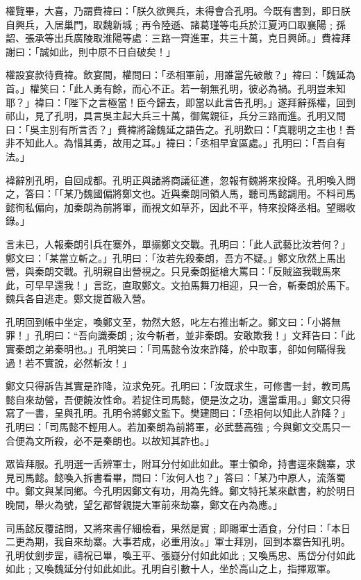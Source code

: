 權覽畢，大喜，乃謂費褘曰：「朕久欲興兵，未得會合孔明。今既有書到，即日朕自興兵，入居巢門，取魏新城﹔再令陸遜、諸葛瑾等屯兵於江夏沔口取襄陽﹔孫韶、張承等出兵廣陵取淮陽等處：三路一齊進軍，共三十萬，克日興師。」費褘拜謝曰：「誠如此，則中原不日自破矣！」

權設宴款待費褘。飲宴間，權問曰：「丞相軍前，用誰當先破敵？」褘曰：「魏延為首。」權笑曰：「此人勇有餘，而心不正。若一朝無孔明，彼必為禍。孔明豈未知耶？」褘曰：「陛下之言極當！臣今歸去，即當以此言告孔明。」遂拜辭孫權，回到祁山，見了孔明，具言吳主起大兵三十萬，御駕親征，兵分三路而進。孔明又問曰：「吳主別有所言否？」費褘將論魏延之語告之。孔明歎曰：「真聰明之主也！吾非不知此人。為惜其勇，故用之耳。」褘曰：「丞相早宜區處。」孔明曰：「吾自有法。」

褘辭別孔明，自回成都。孔明正與諸將商議征進，忽報有魏將來投降。孔明喚入問之，答曰：「「某乃魏國偏將鄭文也。近與秦朗同領人馬，聽司馬懿調用。不料司馬懿徇私偏向，加秦朗為前將軍，而視文如草芥，因此不平，特來投降丞相。望賜收錄。」

言未已，人報秦朗引兵在寨外，單搦鄭文交戰。孔明曰：「此人武藝比汝若何？」鄭文曰：「某當立斬之。」孔明曰：「汝若先殺秦朗，吾方不疑。」鄭文欣然上馬出營，與秦朗交戰。孔明親自出營視之。只見秦朗挺槍大罵曰：「反賊盜我戰馬來此，可早早還我！」言訖，直取鄭文。文拍馬舞刀相迎，只一合，斬秦朗於馬下。魏兵各自逃走。鄭文提首級入營。

孔明回到帳中坐定，喚鄭文至，勃然大怒，叱左右推出斬之。鄭文曰：「小將無罪！」孔明曰：“吾向識秦朗﹔汝今斬者，並非秦朗。安敢欺我！」文拜告曰：「此實秦朗之弟秦明也。」孔明笑曰：「司馬懿令汝來詐降，於中取事，卻如何瞞得我過！若不實說，必然斬汝！」

鄭文只得訴告其實是詐降，泣求免死。孔明曰：「汝既求生，可修書一封，教司馬懿自來劫營，吾便饒汝性命。若捉住司馬懿，便是汝之功，還當重用。」鄭文只得寫了一書，呈與孔明。孔明令將鄭文監下。樊建問曰：「丞相何以知此人詐降？」孔明曰：「司馬懿不輕用人。若加秦朗為前將軍，必武藝高強﹔今與鄭文交馬只一合便為文所殺，必不是秦朗也。以故知其詐也。」

眾皆拜服。孔明選一舌辨軍士，附耳分付如此如此。軍士領命，持書逕來魏寨，求見司馬懿。懿喚入拆書看畢，問曰：「汝何人也？」答曰：「某乃中原人，流落蜀中。鄭文與某同鄉。今孔明因鄭文有功，用為先鋒。鄭文特托某來獻書，約於明日晚間，舉火為號，望乞都督親提大軍前來劫寨，鄭文在內為應。」

司馬懿反覆詰問，又將來書仔細檢看，果然是實﹔即賜軍士酒食，分付曰：「本日二更為期，我自來劫寨。大事若成，必重用汝。」軍士拜別，回到本寨告知孔明。孔明仗劍步罡，禱祝已畢，喚王平、張嶷分付如此如此﹔又喚馬忠、馬岱分付如此如此﹔又喚魏延分付如此如此。孔明自引數十人，坐於高山之上，指揮眾軍。

